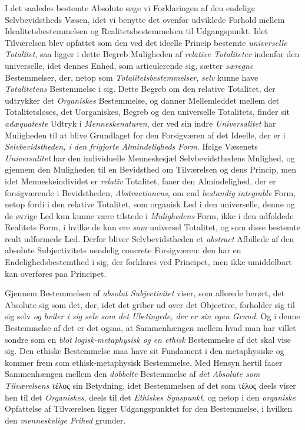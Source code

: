 I det saaledes bestemte Absolute søge vi Forklaringen af den endelige
Selvbevidstheds Væsen, idet vi benytte det ovenfor udviklede Forhold mellem
Idealitetsbestemmelsen og Realitetsbestemmelsen til Udgangspunkt. Idet
Tilværelsen blev opfattet som den ved det ideelle Princip bestemte
\emph{universelle Totalitet}, saa ligger i dette Begreb Muligheden af
\emph{relative Totaliteter} indenfor den universelle, idet dennes Enhed, som
articulerende sig, sætter \emph{særegne} Bestemmelser, der, netop som
\emph{Totalitetsbestemmelser}, \emph{selv} kunne have \emph{Totalitetens}
Bestemmelse i sig. Dette Begreb om den relative Totalitet, der udtrykker det
\emph{Organiskes} Bestemmelse, og danner Mellemleddet mellem det
Totalitetsløses, det Uorganiskes, Begreb og den universelle Totalitets, finder
sit \emph{adæquateste} Udtryk i \emph{Menneskenaturen}, der ved sin indre
\emph{Universalitet} har Muligheden til at blive Grundlaget for den
Forsigværen af det Ideelle, der er i \emph{Selvbevidstheden, i den frigjorte
Almindeligheds Form}. Ifølge Væsenets \emph{Universalitet}
 har den individuelle Menneskesjæl Selvbevidsthedens Mulighed, og gjennem den
Muligheden til en Bevidsthed om Tilværelsen og dens Princip, men idet
Menneskeindividet er \emph{relativ} Totalitet, faaer den Almindelighed, der er
forsigværende i Bevidstheden, \emph{Abstractionens}, om end \emph{bestandig
integrable} Form, netop fordi i den relative Totalitet, som organisk Led i den
universelle, denne og de øvrige Led kun kunne være tilstede i
\emph{Mulighedens} Form, ikke i den udfoldede Realitets Form, i hvilke de kun
ere \emph{som} universel Totalitet, og som disse bestemte realt udformede Led.
Derfor bliver Selvbevidstheden et \emph{abstract} Afbillede af den absolute
Subjectivitets uendelig concrete Forsigværen: den har en
Endelighedsbestemthed i sig, der forklares ved Principet, men ikke umiddelbart
kan overføres paa Principet.

Gjennem Bestemmelsen af \emph{absolut Subjectivitet} viser, som allerede
berørt, det Absolute sig som det, der, idet det griber ud over det Objective,
forholder sig til sig selv \emph{og hviler i sig selv som det Ubetingede, der
er sin egen Grund}. Og i denne Bestemmelse af det er det ogsaa, at
Sammenhængen mellem hvad man har villet sondre som en \emph{blot
logisk-metaphysisk og en ethisk} Bestemmelse af det skal vise sig. Den ethiske
Bestemmelse maa have sit Fundament i den metaphysiske og kommer frem som
ethisk-metaphysisk Bestemmelse. Med Hensyn hertil faaer Sammenhængen mellem
den \emph{dobbelte} Bestemmelse af \emph{det Absolute som Tilværelsens} τέλος
sin Betydning, idet Bestemmelsen af det som τέλος deels viser hen til det
\emph{Organiskes}, deels til det \emph{Ethiskes Synspunkt}, og netop i den
\emph{organiske} Opfattelse af Tilværelsen ligger Udgangspunktet for den
Bestemmelse, i hvilken den \emph{menneskelige Frihed} grunder.


